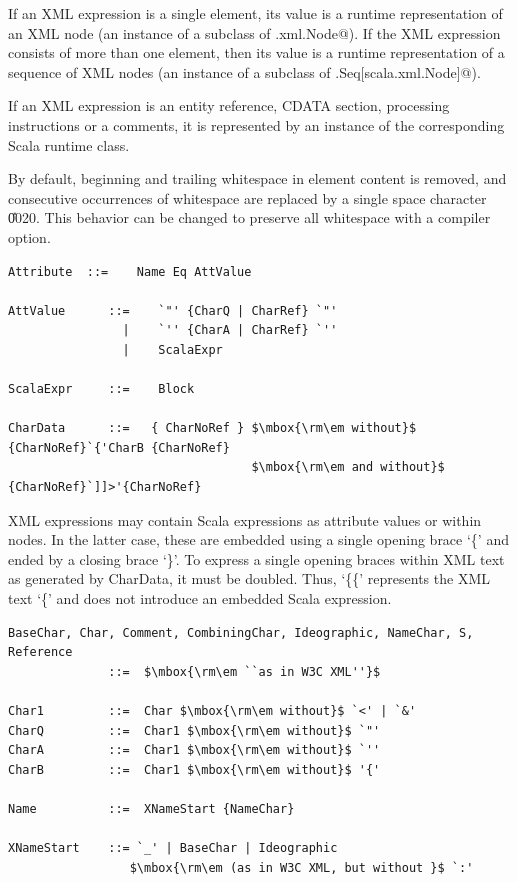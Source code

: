 If an XML expression is a single element, its value is a runtime
representation of an XML node (an instance of a subclass of 
\lstinline@scala.xml.Node@). If the XML expression consists of more
than one element, then its value is a runtime representation of a
sequence of XML nodes (an instance of a subclass of 
\lstinline@scala.Seq[scala.xml.Node]@).

If an XML expression is an entity reference, CDATA section, processing 
instructions or a comments, it is represented by an instance of the 
corresponding Scala runtime class.

By default, beginning and trailing whitespace in element content is removed, 
and consecutive occurrences of whitespace are replaced by a single space
character \U{0020}. This behavior can be changed to preserve all whitespace
with a compiler option.

\syntax\begin{lstlisting}
Attribute  ::=    Name Eq AttValue                                    

AttValue      ::=    `"' {CharQ | CharRef} `"'
                |    `'' {CharA | CharRef} `''
                |    ScalaExpr

ScalaExpr     ::=    Block

CharData      ::=   { CharNoRef } $\mbox{\rm\em without}$ {CharNoRef}`{'CharB {CharNoRef} 
                                  $\mbox{\rm\em and without}$ {CharNoRef}`]]>'{CharNoRef}
\end{lstlisting}
XML expressions may contain Scala expressions as attribute values or
within nodes. In the latter case, these are embedded using a single opening 
brace `\{' and ended by a closing brace `\}'. To express a single opening braces 
within XML text as generated by CharData, it must be doubled. Thus, `\{\{'
represents the XML text `\{' and does not introduce an embedded Scala
expression.

\syntax\begin{lstlisting}
BaseChar, Char, Comment, CombiningChar, Ideographic, NameChar, S, Reference
              ::=  $\mbox{\rm\em ``as in W3C XML''}$

Char1         ::=  Char $\mbox{\rm\em without}$ `<' | `&'
CharQ         ::=  Char1 $\mbox{\rm\em without}$ `"'
CharA         ::=  Char1 $\mbox{\rm\em without}$ `''
CharB         ::=  Char1 $\mbox{\rm\em without}$ '{'

Name          ::=  XNameStart {NameChar}

XNameStart    ::= `_' | BaseChar | Ideographic 
                 $\mbox{\rm\em (as in W3C XML, but without }$ `:'

\end{lstlisting}
